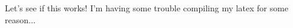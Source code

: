\documentclass{article}
\begin{document}
Let's see if this works!
I'm having some trouble compiling my latex for some reason...
\end{document}
